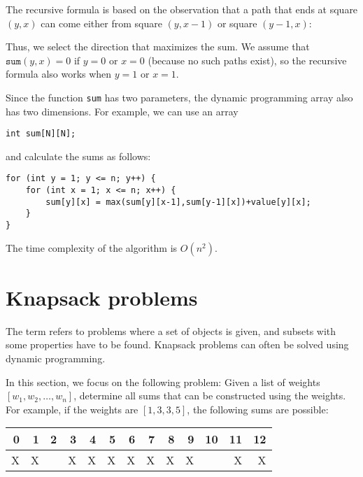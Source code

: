 The recursive formula is based on the observation
that a path that ends at square $(y,x)$
can come either from square $(y,x-1)$
or square $(y-1,x)$:
\begin{center}
\end{center}

Thus, we select the direction that maximizes
the sum.
We assume that $\texttt{sum}(y,x)=0$
if $y=0$ or $x=0$ (because no such paths exist),
so the recursive formula also works when $y=1$ or $x=1$.

Since the function \texttt{sum} has two parameters,
the dynamic programming array also has two dimensions.
For example, we can use an array
\begin{lstlisting}
int sum[N][N];
\end{lstlisting}
and calculate the sums as follows:
\begin{lstlisting}
for (int y = 1; y <= n; y++) {
    for (int x = 1; x <= n; x++) {
        sum[y][x] = max(sum[y][x-1],sum[y-1][x])+value[y][x];
    }
}
\end{lstlisting}
The time complexity of the algorithm is $O(n^2)$.

\section{Knapsack problems}


The term  refers to problems where
a set of objects is given, and 
subsets with some properties
have to be found.
Knapsack problems can often be solved
using dynamic programming.

In this section, we focus on the following
problem: Given a list of weights
$[w_1,w_2,\ldots,w_n]$,
determine all
sums that can be constructed using the weights.
For example, if the weights are
$[1,3,3,5]$, the following sums are possible:

\begin{center}
\begin{tabular}{rrrrrrrrrrrrr}
 0 & 1 & 2 & 3 & 4 & 5 & 6 & 7 & 8 & 9 & 10 & 11 & 12 \\
\hline
 X & X & & X & X & X & X & X & X & X & & X & X \\
\end{tabular}
\end{center}

